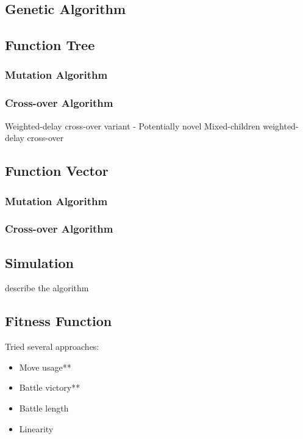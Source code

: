 \documentclass{acm_proc_article-sp}
\begin{document}
    \subsection{Genetic Algorithm}

    \subsection{Function Tree}

        \subsubsection{Mutation Algorithm}
        \subsubsection{Cross-over Algorithm}

    Weighted-delay cross-over variant - Potentially novel
    Mixed-children weighted-delay cross-over

    \subsection{Function Vector}
    
        \subsubsection{Mutation Algorithm}
        \subsubsection{Cross-over Algorithm}

    \subsection{Simulation}
    
    describe the algorithm

    \subsection{Fitness Function}
    
    Tried several approaches:
    \begin{itemize}
        \item Move usage**
        \item Battle victory**
        \item Battle length
        \item Linearity
    \end{itemize}
    
\end{document}

